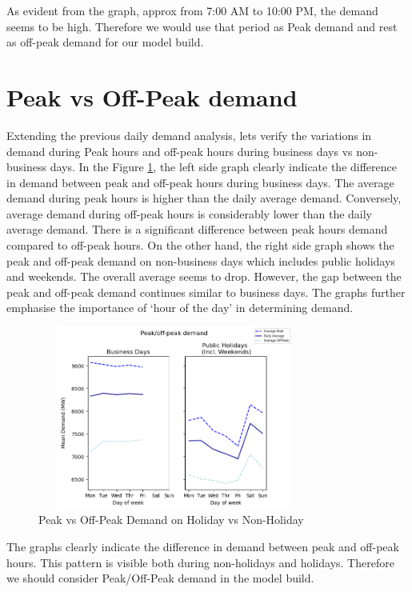 \documentclass[mstat,12pt]{unswthesis}
\begin{document}
As evident from the graph, approx from 7:00 AM to 10:00 PM, the demand
seems to be high. Therefore we would use that period as Peak demand and
rest as off-peak demand for our model build.

\section{Peak vs Off-Peak demand}\label{peak-vs-off-peak-demand}

Extending the previous daily demand analysis, lets verify the variations
in demand during Peak hours and off-peak hours during business days vs
non-business days. In the Figure \ref{holiday_nonholiday}, the left side
graph clearly indicate the difference in demand between peak and
off-peak hours during business days. The average demand during peak
hours is higher than the daily average demand. Conversely, average
demand during off-peak hours is considerably lower than the daily
average demand. There is a significant difference between peak hours
demand compared to off-peak hours. On the other hand, the right side
graph shows the peak and off-peak demand on non-business days which
includes public holidays and weekends. The overall average seems to
drop. However, the gap between the peak and off-peak demand continues
similar to business days. The graphs further emphasise the importance of
`hour of the day' in determining demand.

\begin{figure}[H]
\centering
\includegraphics[width=0.80\textwidth,height=6cm]{holiday_nonholiday.png}
\caption{Peak vs Off-Peak Demand on Holiday vs Non-Holiday}
\label{holiday_nonholiday}
\end{figure}

The graphs clearly indicate the difference in demand between peak and
off-peak hours. This pattern is visible both during non-holidays and
holidays. Therefore we should consider Peak/Off-Peak demand in the model
build.
\end{document}
